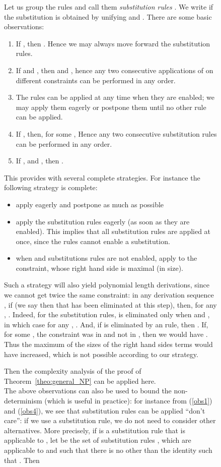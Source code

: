 \documentclass[acmtocl,acmnow]{acmtrans2m}
\begin{document}
\begin{figure}[t]
{{Let us group the rules  and call them \emph{substitution
  rules} . We write  if the substitution is obtained by
unifying  and .  There are some basic observations:
\begin{enumerate}
\item \label{obs1} 
If , then 
. Hence we may always move
forward the substitution rules.
\item \label{obs2} 
If  and , then
 and
,
hence any two consecutive applications of  on different constraints
can be performed in any order. 
\item \label{obs3} 
The rules  can be applied
at any time when they are enabled; we may apply them eagerly or postpone
them until no other rule can be applied.
\item \label{obs4} 
If , then, for some
, 
 Hence any two consecutive
substitution rules can be performed in any order. 
\item \label{obs5} 
If , and ,
 then .
\end{enumerate}

This provides with several complete strategies. For instance the
following strategy is complete:
\begin{itemize}
\item apply eagerly  and postpone  as much as possible
\item apply the substitution rules eagerly (as soon as they are enabled).
This implies that all substitution rules are applied at once, since the
rules  cannot enable a substitution.
\item when  and substitutions rules are not enabled, apply
 to the constraint, whose right hand side is maximal (in size).
\end{itemize}
Such a strategy will also yield polynomial length derivations, since
we cannot get twice the same constraint: in any derivation sequence
,
if  (we say then that 
has been eliminated at this step), then, for any , .
Indeed, for the substitution rules,  is eliminated only  when 
and , in which case for any , .
And, if   is eliminated by an  rule, then
 . If, for some , the
constraint  was in  and not in  , 
 then we would have .
Thus the maximum of the sizes of the right hand sides terms would have increased, which is not possible according to our strategy.

Then the complexity analysis of
the proof of Theorem~\ref{theo:general_NP} can be applied here.
\\

The above observations can also be used to bound the non-determinism
(which is useful in practice): 
for instance from (\ref{obs1}) and (\ref{obs4}), we see that
substitution rules can be applied ``don't care'': if we use
a substitution rule, we do not need to consider other alternatives.  
More precisely, if  is a substitution rule that is applicable to
, let  be the set of substitution rules , which
are applicable to  and such that there is no  other than the identity
such that
. 
Then







}}
\end{figure}
\end{document}
